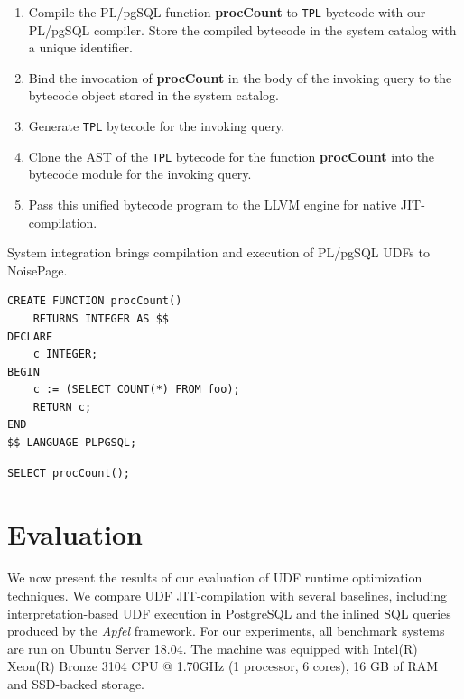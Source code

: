 \documentclass{vldb}
\newcommand{\tpl}{\texttt{TPL}\xspace}
\newcommand{\dbCode}[1]{{\sffamily\small \textbf{#1}}\xspace}
\newcommand{\plpgsql}{PL/pgSQL\xspace}
\begin{document}
\begin{enumerate}
    \item Compile the \plpgsql function \dbCode{procCount} to \tpl byetcode with our \plpgsql compiler. Store the compiled bytecode in the system catalog with a unique identifier.
    \item Bind the invocation of \dbCode{procCount} in the body of the invoking query to the bytecode object stored in the system catalog.
    \item Generate \tpl bytecode for the invoking query.
    \item Clone the AST of the \tpl bytecode for the function \dbCode{procCount} into the bytecode module for the invoking query.
    \item Pass this unified bytecode program to the LLVM engine for native JIT-compilation.
\end{enumerate}

System integration brings compilation and execution of \plpgsql UDFs to NoisePage.

\begin{listing}
    \begin{verbatim}
CREATE FUNCTION procCount() 
    RETURNS INTEGER AS $$
DECLARE 
    c INTEGER;
BEGIN
    c := (SELECT COUNT(*) FROM foo);
    RETURN c;
END
$$ LANGUAGE PLPGSQL;
    \end{verbatim}
    \caption{Defintion of UDF \dbCode{procCount}.}
    \label{list:udf_example_definition}
\end{listing}

\begin{listing}
    \begin{verbatim}
SELECT procCount();
    \end{verbatim}
    \caption{The invocation of UDF \dbCode{procCount}.}
    \label{list:udf_example_invocation}
\end{listing}


\section{Evaluation}

We now present the results of our evaluation of UDF runtime optimization techniques. We compare UDF JIT-compilation with several baselines, including interpretation-based UDF execution in PostgreSQL and the inlined SQL queries produced by the \textit{Apfel} framework. For our experiments, all benchmark systems are run on Ubuntu Server 18.04. The machine was equipped with Intel(R) Xeon(R) Bronze 3104 CPU @ 1.70GHz (1 processor, 6 cores), 16 GB of RAM and SSD-backed storage.
\end{document}
